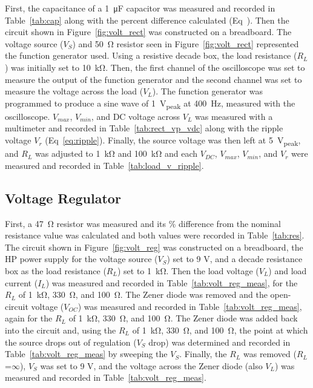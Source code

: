 \documentclass{article}
\begin{document}
First, the capacitance of a \SI{1}{\micro\farad} capacitor was measured and  recorded in Table~\ref{tab:cap} along with the percent difference calculated (Eq~\label{eq:percent_diff}).  Then the circuit shown in Figure~\ref{fig:volt_rect} was constructed on a breadboard.  The voltage source ($V_S$) and \SI{50}{\ohm} resistor seen in Figure~\ref{fig:volt_rect} represented the function generator used.  Using a resistive decade box, the load resistance ($R_L$) was initially set to \SI{10}{\kilo\ohm}.  Then, the first channel of the oscilloscope was set to measure the output of the function generator and the second channel was set to measure the voltage across the load ($V_L$).  The function generator was programmed to produce a sine wave of \SI{1}{V_{peak}} at \SI{400}{\hertz}, measured with the oscilloscope.  $V_{max}$, $V_{min}$, and DC voltage across $V_L$ was measured with a multimeter and recorded in Table~\ref{tab:rect_vp_vdc} along with the ripple voltage $V_r$ (Eq~\ref{eq:ripple}).  Finally, the source voltage was then left at \SI{5}{V_{peak}}, and $R_L$ was adjusted to \SI{1}{\kilo\ohm} and \SI{100}{\kilo\ohm} and each $V_{DC}$, $V_{max}$, $V_{min}$, and $V_r$ were measured and recorded in Table~\ref{tab:load_v_ripple}.

\subsection{Voltage Regulator}
\label{sec:volt_reg}

First, a \SI{47}{\ohm} resistor was measured and its \% difference from the nominal resistance value was calculated and both values were recorded in Table~\ref{tab:res}.  The circuit shown in Figure~\ref{fig:volt_reg} was constructed on a breadboard, the HP power supply for the voltage source ($V_S$) set to 9 V, and a decade resistance box as the load resistance ($R_L$) set to \SI{1}{\kilo\ohm}.  Then the load voltage ($V_L$) and load current ($I_L$) was measured and recorded in Table~\ref{tab:volt_reg_meas}, for the $R_L$ of \SI{1}{\kilo\ohm}, \SI{330}{\ohm}, and \SI{100}{\ohm}.  The Zener diode was removed and the open-circuit voltage ($V_{OC}$) was measured and recorded in Table~\ref{tab:volt_reg_meas}, again for the $R_L$ of \SI{1}{\kilo\ohm}, \SI{330}{\ohm}, and \SI{100}{\ohm}.  The Zener diode was added back into the circuit and, using the $R_L$ of \SI{1}{\kilo\ohm}, \SI{330}{\ohm}, and \SI{100}{\ohm}, the point at which the source drops out of regulation ($V_S$ drop) was determined and recorded in Table~\ref{tab:volt_reg_meas} by sweeping the $V_S$.  Finally, the $R_L$ was removed ($R_L$=$\infty$), $V_S$ was set to 9 V, and the voltage across the Zener diode (also $V_L$) was measured and recorded in Table~\ref{tab:volt_reg_meas}.
\end{document}
